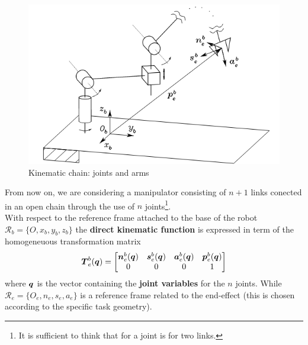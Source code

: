 \begin{figure} [h]
    \centering
    \includegraphics[scale=0.8]{img/kinematic_chain.png}
    \caption{Kinematic chain: joints and arms}
    \label{fig:chain}
\end{figure}
From now on, we are considering a manipulator consisting of $n+1$ links conected in an open chain through the use of $n$ joints\footnote{It is sufficient to think that for a joint is for two links.}.\\
With respect to the reference frame attached to the base of the robot $\mathcal{R}_b=\{O,x_b,y_b,z_b\}$ the \textbf{direct kinematic function} is expressed in term of the homogeneuous transformation matrix 
\begin{equation}
    \boldsymbol{T}_e^b(\boldsymbol{q})=\begin{bmatrix}
        \boldsymbol{n}_e^b(\boldsymbol{q})& \boldsymbol{s}_e^b(\boldsymbol{q})& \boldsymbol{a}_e^b(\boldsymbol{q})& \boldsymbol{p}_e^b(\boldsymbol{q})\\
        0&0&0&1
    \end{bmatrix}
    \label{eq:homtransform}
\end{equation}
where $\boldsymbol{q}$ is the vector containing the \textbf{joint variables} for the $n$ joints. While $\mathcal{R}_e=\{O_e,n_e,s_e,a_e\}$ is a reference frame related to the end-effect (this is chosen according to the specific task geometry). 
